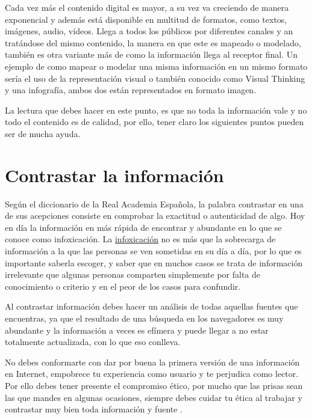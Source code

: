 \documentclass[
  spanish,
  a4paper,
  openany]{book}
\begin{document}
Cada vez más el contenido digital es mayor, a su vez va creciendo de manera exponencial y además está disponible en multitud de formatos, como textos, imágenes, audio, vídeos. Llega a todos los públicos por diferentes canales y an tratándose del mismo contenido, la manera en que este es mapeado o modelado, también es otra variante más de como la información llega al receptor final. Un ejemplo de como mapear o modelar una misma información en un mismo formato sería el uso de la representación visual o también conocido como Visual Thinking y una infografía, ambos dos están representados en formato imagen.

La lectura que debes hacer en este punto, es que no toda la información vale y no todo el contenido es de calidad, por ello, tener claro los siguientes puntos pueden ser de mucha ayuda.

\hypertarget{contrastar-la-informaciuxf3n}{%
\section{Contrastar la información}\label{contrastar-la-informaciuxf3n}}

Según el diccionario de la Real Academia Española, la palabra contrastar en una de sus acepciones consiste en comprobar la exactitud o autenticidad de algo. Hoy en día la información en más rápida de encontrar y abundante en lo que se conoce como infoxicación. La \href{https://es.godaddy.com/blog/infoxicacion-causas-consecuencias/}{infoxicación} no es más que la sobrecarga de información a la que las personas se ven sometidas en su día a día, por lo que es importante saberla escoger, y saber que en muchos casos se trata de información irrelevante que algunas personas comparten simplemente por falta de conocimiento o criterio y en el peor de los casos para confundir.

Al contrastar información debes hacer un análisis de todas aquellas fuentes que encuentras, ya que el resultado de una búsqueda en los navegadores es muy abundante y la información a veces es efímera y puede llegar a no estar totalmente actualizada, con lo que eso conlleva.

No debes conformarte con dar por buena la primera versión de una información en Internet, empobrece tu experiencia como usuario y te perjudica como lector. Por ello debes tener presente el compromiso ético, por mucho que las prisas sean las que mandes en algunas ocasiones, siempre debes cuidar tu ética al trabajar y contrastar muy bien toda información y fuente \citep{contrastar-informacion}.
\end{document}
